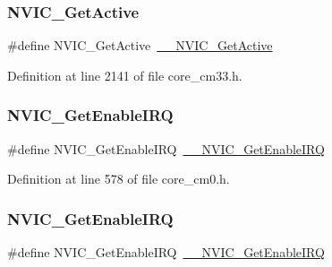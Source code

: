 \subsubsection{\texorpdfstring{N\+V\+I\+C\+\_\+\+Get\+Active}{NVIC\_GetActive}\hspace{0.1cm}{\footnotesize\ttfamily [9/9]}}
{\footnotesize\ttfamily \#define N\+V\+I\+C\+\_\+\+Get\+Active~\hyperlink{group___c_m_s_i_s___core___n_v_i_c_functions_gaa2837003c28c45abf193fe5e8d27f593}{\+\_\+\+\_\+\+N\+V\+I\+C\+\_\+\+Get\+Active}}



Definition at line 2141 of file core\+\_\+cm33.\+h.

\mbox{\label{group___c_m_s_i_s___core___n_v_i_c_functions_ga857de13232ec65dd15087eaa15bc4a69}} 
\subsubsection{\texorpdfstring{N\+V\+I\+C\+\_\+\+Get\+Enable\+I\+RQ}{NVIC\_GetEnableIRQ}\hspace{0.1cm}{\footnotesize\ttfamily [1/13]}}
{\footnotesize\ttfamily \#define N\+V\+I\+C\+\_\+\+Get\+Enable\+I\+RQ~\hyperlink{group___c_m_s_i_s___core___n_v_i_c_functions_gaaeb5e7cc0eaad4e2817272e7bf742083}{\+\_\+\+\_\+\+N\+V\+I\+C\+\_\+\+Get\+Enable\+I\+RQ}}



Definition at line 578 of file core\+\_\+cm0.\+h.

\mbox{\label{group___c_m_s_i_s___core___n_v_i_c_functions_ga857de13232ec65dd15087eaa15bc4a69}} 
\subsubsection{\texorpdfstring{N\+V\+I\+C\+\_\+\+Get\+Enable\+I\+RQ}{NVIC\_GetEnableIRQ}\hspace{0.1cm}{\footnotesize\ttfamily [2/13]}}
{\footnotesize\ttfamily \#define N\+V\+I\+C\+\_\+\+Get\+Enable\+I\+RQ~\hyperlink{group___c_m_s_i_s___core___n_v_i_c_functions_gaaeb5e7cc0eaad4e2817272e7bf742083}{\+\_\+\+\_\+\+N\+V\+I\+C\+\_\+\+Get\+Enable\+I\+RQ}}



